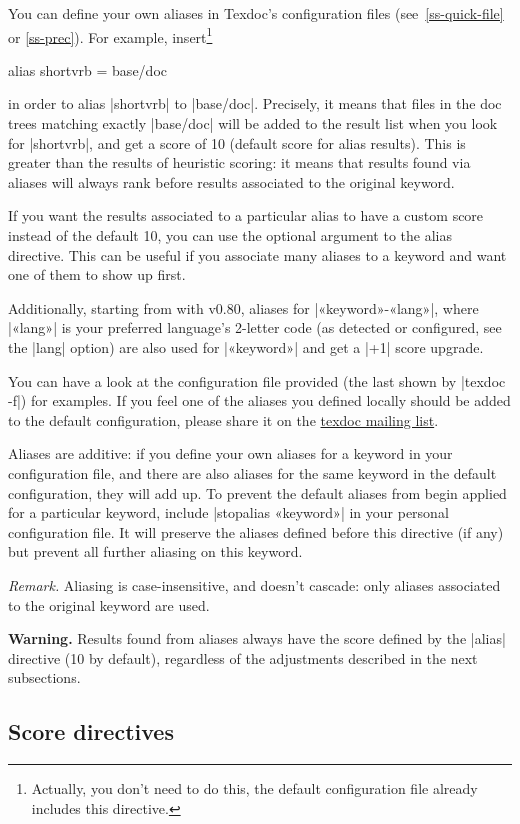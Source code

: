 \documentclass[a4paper, oneside]{scrartcl}
\makeatletter
\newenvironment{htcode}{%
  \SaveVerbatim[samepage, gobble=2]{verbmat}%
  }{%
  \endSaveVerbatim
  \par\medskip\noindent\hspace*{\parindent}%
  \BUseVerbatim{verbmat}%
  \par\medskip\@endpetrue}
\newcommand\tdml{\href{http://lists.tug.org/texdoc}{texdoc mailing list}\xspace}
\makeatother
\begin{document}
You can define your own aliases in Texdoc's configuration files
(see~\ref{ss-quick-file} or \ref{ss-prec}). For example,
insert\footnote{Actually, you don't need to do this, the default configuration
  file already includes this directive.}
\begin{htcode}
  alias shortvrb = base/doc
\end{htcode}
in order to alias |shortvrb| to |base/doc|. Precisely, it means that files in
the doc trees matching exactly |base/doc| will be added to the result list
when you look for |shortvrb|, and get a score of 10 (default score for alias
results). This is greater than the results of heuristic scoring: it means that
results found via aliases will always rank before results associated to the
original keyword.

If you want the results associated to a particular alias to have a custom
score instead of the default 10, you can use the optional argument to the
alias directive. This can be useful if you associate many aliases to
a keyword and want one of them to show up first.

Additionally, starting from with v0.80, aliases for |«keyword»-«lang»|, where
|«lang»| is your preferred language's 2-letter code (as detected or
configured, see the |lang| option) are also used for |«keyword»| and get a
|+1| score upgrade.

You can have a look at the configuration file provided (the last shown by
|texdoc -f|) for examples.  If you feel one of the aliases you defined locally
should be added to the default configuration, please share it on the \tdml.

Aliases are additive: if you define your own aliases for a keyword in your
configuration file, and there are also aliases for the same keyword in the
default configuration, they will add up. To prevent the default aliases
from begin applied for a particular keyword, include |stopalias «keyword»| in
your personal configuration file. It will preserve the aliases defined before
this directive (if any) but prevent all further aliasing on this keyword.

\textit{Remark.} Aliasing is case-insensitive, and doesn't cascade:
only aliases associated to the original keyword are used.

\textbf{Warning.} Results found from aliases always have the score defined by
the |alias| directive (10 by default), regardless of the adjustments described
in the next subsections.

\subsection{Score directives}\label{ss-score}
\end{document}
